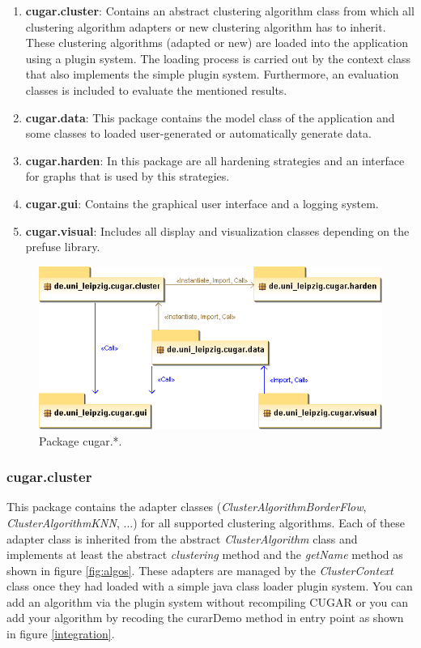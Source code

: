 \documentclass[a4paper, 11pt]{article}
\begin{document}
		\begin{enumerate}
			\item \textbf{cugar.cluster}: 
			Contains an abstract clustering algorithm class from which all clustering algorithm adapters or new clustering algorithm has to inherit.
			These clustering algorithms (adapted or new) are loaded into the application using a plugin system. 
			The loading process is carried out by the context class that also implements the simple plugin system. 
			Furthermore, an evaluation classes is included to evaluate the mentioned results.
			\item \textbf{cugar.data}:		
			This package contains the model class of the application and some classes to loaded user-generated or automatically generate data. 			
			\item \textbf{cugar.harden}:
			In this package are all hardening strategies and an interface for graphs that is used by this strategies.		
			\item \textbf{cugar.gui}:
			Contains the graphical user interface and a logging system.			
			\item \textbf{cugar.visual}:	
			Includes all display and visualization classes depending on the prefuse library.			
		\end{enumerate}
		\begin{figure}[h!]
			\centering \includegraphics[width = 1\textwidth]{img/packageAll.png}
			\caption{Package cugar.*.} \label{fig:cvk.package}
		\end{figure}
		
	\subsubsection*{cugar.cluster}\label{sec:cvk.cluster}
		This package contains the adapter classes (\emph{ClusterAlgorithmBorderFlow}, \emph{ClusterAlgorithmKNN}, ...) for all supported clustering algorithms. 		
		Each of these adapter class is inherited from the abstract \emph{ClusterAlgorithm} class and implements 
		at least the abstract \emph{clustering} method and the \emph{getName} method as shown in figure \ref{fig:algos}. 
		These adapters are managed by the \emph{ClusterContext} class once they had loaded with a simple java class loader plugin system.
		You can add an algorithm via the plugin system without recompiling CUGAR   
		or you can add your algorithm by recoding the curarDemo method in entry point as shown in figure \ref{integration}.\\
\end{document}

